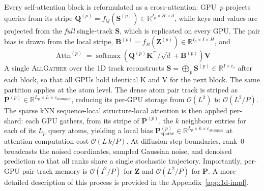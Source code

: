 \documentclass{article}
\theoremstyle{plain}
\theoremstyle{definition}
\theoremstyle{remark}
\begin{document}
Every self-attention block is reformulated as a cross-attention: GPU~$p$ projects queries from its stripe $\mathbf{Q}^{(p)}=f_Q(\mathbf{S}^{(p)})\in\mathbb{R}^{I_p\times H\times d}$, while keys and values are projected from the \emph{full} single-track $\mathbf{S}$, which is replicated on every GPU. The pair bias is drawn from the local stripe, $\mathbf{B}^{(p)}=f_B(\mathbf{Z}^{(p)})\in\mathbb{R}^{I_p\times I\times H}$, and
\begin{equation}
\operatorname{Attn}^{(p)} = \operatorname{softmax}\!\left(
  \mathbf{Q}^{(p)} \mathbf{K}^\top/\sqrt{d} + \mathbf{B}^{(p)}
\right) \mathbf{V}
\label{eq:cross_attn}
\end{equation}
A single \textsc{AllGather} over the 1D track reconstructs $\mathbf{S}=\bigoplus_{p}\mathbf{S}^{(p)}\in\mathbb{R}^{I\times c_s}$ after each block, so that all GPUs hold identical K and V for the next block. The same partition applies at the atom level. The dense atom pair track is striped as $\mathbf{P}^{(p)}\in\mathbb{R}^{L_p\times L\times c_\text{atompair}}$, reducing its per-GPU storage from $\mathcal{O}(L^{2})$ to $\mathcal{O}(L^{2}/P)$. The sparse kNN sequence-local structure-local attention is then applied per-shard: each GPU gathers, from its stripe of $\mathbf{P}^{(p)}$, the $k$ neighbour entries for each of its $L_p$ query atoms, yielding a local bias $\mathbf{P}^{(p)}_\text{sparse}\in\mathbb{R}^{L_p\times k\times c_\text{atompair}}$ at attention-computation cost $\mathcal{O}(L\,k/P)$. At diffusion-step boundaries, rank~0 broadcasts the noised coordinates, sampled Gaussian noise, and denoised prediction so that all ranks share a single stochastic trajectory. Importantly, per-GPU pair-track memory is $\mathcal{O}(I^{2}/P)$ for $\mathbf{Z}$ and $\mathcal{O}(L^{2}/P)$ for $\mathbf{P}$. A more detailed description of this process is provided in the Appendix~\ref{app:1d-impl}.

\end{document}
